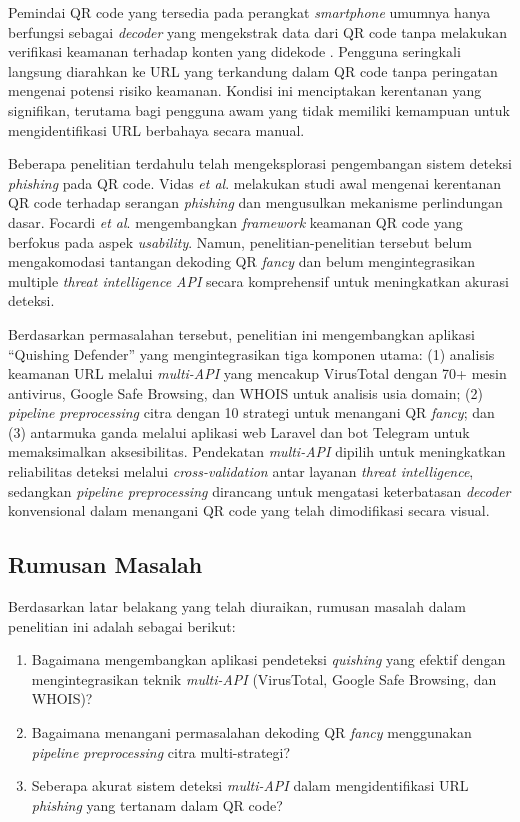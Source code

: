 \documentclass[conference]{IEEEtran}
\begin{document}
Pemindai QR code yang tersedia pada perangkat \textit{smartphone} umumnya hanya berfungsi sebagai \textit{decoder} yang mengekstrak data dari QR code tanpa melakukan verifikasi keamanan terhadap konten yang didekode \cite{krombholz_qr_2014}. Pengguna seringkali langsung diarahkan ke URL yang terkandung dalam QR code tanpa peringatan mengenai potensi risiko keamanan. Kondisi ini menciptakan kerentanan yang signifikan, terutama bagi pengguna awam yang tidak memiliki kemampuan untuk mengidentifikasi URL berbahaya secara manual.

Beberapa penelitian terdahulu telah mengeksplorasi pengembangan sistem deteksi \textit{phishing} pada QR code. Vidas \textit{et al}. \cite{vidas_qrishing_2013} melakukan studi awal mengenai kerentanan QR code terhadap serangan \textit{phishing} dan mengusulkan mekanisme perlindungan dasar. Focardi \textit{et al}. \cite{focardi_usable_2019} mengembangkan \textit{framework} keamanan QR code yang berfokus pada aspek \textit{usability}. Namun, penelitian-penelitian tersebut belum mengakomodasi tantangan dekoding QR \textit{fancy} dan belum mengintegrasikan multiple \textit{threat intelligence API} secara komprehensif untuk meningkatkan akurasi deteksi.

Berdasarkan permasalahan tersebut, penelitian ini mengembangkan aplikasi ``Quishing Defender'' yang mengintegrasikan tiga komponen utama: (1) analisis keamanan URL melalui \textit{multi-API} yang mencakup VirusTotal dengan 70+ mesin antivirus, Google Safe Browsing, dan WHOIS untuk analisis usia domain; (2) \textit{pipeline} \textit{preprocessing} citra dengan 10 strategi untuk menangani QR \textit{fancy}; dan (3) antarmuka ganda melalui aplikasi web Laravel dan bot Telegram untuk memaksimalkan aksesibilitas. Pendekatan \textit{multi-API} dipilih untuk meningkatkan reliabilitas deteksi melalui \textit{cross-validation} antar layanan \textit{threat intelligence}, sedangkan \textit{pipeline preprocessing} dirancang untuk mengatasi keterbatasan \textit{decoder} konvensional dalam menangani QR code yang telah dimodifikasi secara visual.

\subsection{Rumusan Masalah}

Berdasarkan latar belakang yang telah diuraikan, rumusan masalah dalam penelitian ini adalah sebagai berikut:

\begin{enumerate}[label=\arabic*)]
    \item Bagaimana mengembangkan aplikasi pendeteksi \textit{quishing} yang efektif dengan mengintegrasikan teknik \textit{multi-API} (VirusTotal, Google Safe Browsing, dan WHOIS)?
    \item Bagaimana menangani permasalahan dekoding QR \textit{fancy} menggunakan \textit{pipeline preprocessing} citra multi-strategi?
    \item Seberapa akurat sistem deteksi \textit{multi-API} dalam mengidentifikasi URL \textit{phishing} yang tertanam dalam QR code?
\end{enumerate}
\end{document}
